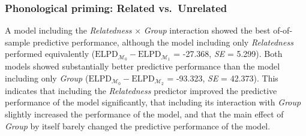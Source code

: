 \documentclass[
  letterpaper,
  DIV=11,
  numbers=noendperiod]{scrartcl}
\begin{document}
\hypertarget{phonological-priming-related-vs.-unrelated-3}{%
\subsubsection{Phonological priming: Related
vs.~Unrelated}\label{phonological-priming-related-vs.-unrelated-3}}

A model including the \emph{Relatedness} \(\times\) \emph{Group}
interaction showed the best of-of-sample predictive performance,
although the model including only \emph{Relatedness} performed
equivalently
(\(\text{ELPD}_{\mathcal{M_0}} - \text{ELPD}_{\mathcal{M_1}}\) =
-27.368, \emph{SE} = 5.299). Both models showed substantially better
predictive performance than the model including only \emph{Group}
(\(\text{ELPD}_{\mathcal{M_0}} - \text{ELPD}_{\mathcal{M_2}}\) =
-93.323, \emph{SE} = 42.373). This indicates that including the
\emph{Relatedness} predictor improved the predictive performance of the
model significantly, that including its interaction with \emph{Group}
slightly increased the performance of the model, and that the main
effect of \emph{Group} by itself barely changed the predictive
performance of the model.
\end{document}
